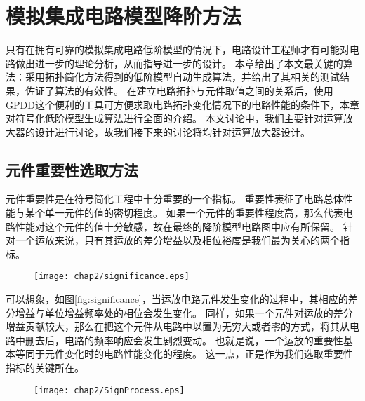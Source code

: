 
\chapter{模拟集成电路模型降阶方法}
\label{chap:MOR}

只有在拥有可靠的模拟集成电路低阶模型的情况下，电路设计工程师才有可能对电路做出进一步的理论分析，从而指导进一步的设计。
本章给出了本文最关键的算法：采用拓扑简化方法得到的低阶模型自动生成算法，并给出了其相关的测试结果，佐证了算法的有效性。
在建立电路拓扑与元件取值之间的关系后，使用GPDD这个便利的工具可方便求取电路拓扑变化情况下的电路性能的条件下，本章对符号化低阶模型生成算法进行全面的介绍。
本文讨论中，我们主要针对运算放大器的设计进行讨论，故我们接下来的讨论将均针对运算放大器设计。

\section{元件重要性选取方法}
\label{subsec:simp:alg:significance}

元件重要性是在符号简化工程中十分重要的一个指标。
重要性表征了电路总体性能与某个单一元件的值的密切程度。
如果一个元件的重要性程度高，那么代表电路性能对这个元件的值十分敏感，故在最终的降阶模型电路图中应有所保留。
针对一个运放来说，只有其运放的差分增益以及相位裕度是我们最为关心的两个指标。

\begin{figure}[!htp]
	\centering
	\texttt{[image: chap2/significance.eps]}
\end{figure}

可以想象，如图\ref{fig:significance}，当运放电路元件发生变化的过程中，其相应的差分增益与单位增益频率处的相位会发生变化。
同样，如果一个元件对运放的差分增益贡献较大，那么在把这个元件从电路中以置为无穷大或者零的方式，将其从电路中删去后，电路的频率响应会发生剧烈变动。
也就是说，一个运放的重要性基本等同于元件变化时的电路性能变化的程度。
这一点，正是作为我们选取重要性指标的关键所在。

\begin{figure}[!htp]
	\centering
	\texttt{[image: chap2/SignProcess.eps]}
\end{figure}

